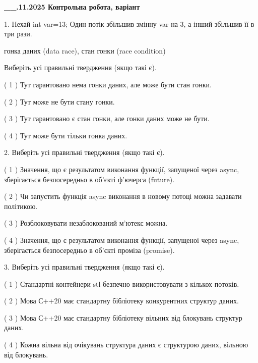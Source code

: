 \documentclass[12pt, ukrainian]{article}
\begin{document}
\newpage
\begin {large}

\textbf{\_\_.11.2025 Контрольна робота, варіант  }\par


{
1. Нехай int var=13; Один потік збільшив змінну var на 3, а інший збільшив її в три рази.

гонка даних (data race), стан гонки (race condition)

Виберіть усі правильні твердження (якщо такі є).\par
\vspace{2mm}
( 1 ) Тут гарантовано нема гонки даних, але може бути стан гонки.%

( 2 ) Тут може не бути стану гонки.%

( 3 ) Тут гарантовано є стан гонки, але гонки даних може не бути.%

( 4 ) Тут може бути тільки гонка даних.%


2. Виберіть усі правильні твердження (якщо такі є).\par
\vspace{2mm}

( 1 ) Значення, що є результатом виконання функції, запущеної через async, зберігається безпосередньо в об’єкті ф’ючерса (future).%

( 2 ) Чи запустить функція  async виконання в новому потоці можна задавати політикою.%

( 3 ) Розблоковувати незаблокований м’ютекс можна.%

( 4 ) Значення, що є результатом виконання функції, запущеної через async, зберігається безпосередньо в об’єкті проміза (promise).%


3. Виберіть усі правильні твердження (якщо такі є).\par
\vspace{2mm}

( 1 ) Стандартні контейнери stl безпечно використовувати з кількох потоків.%

( 2 ) Мова С++20 має стандартну бібліотеку конкурентних структур даних.%

( 3 ) Мова С++20 має стандартну бібліотеку вільних від блокувань структур даних.%

( 4 ) Кожна вільна від очікувань структура даних є структурою даних, вільною від блокувань.%


}
\end{large}
\end{document}
